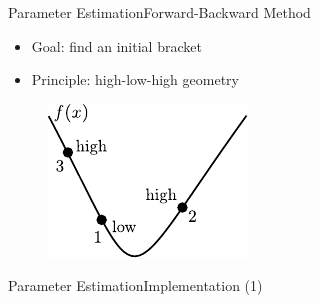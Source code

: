 \begin{frame}{Parameter Estimation}{Forward-Backward Method}
  \begin{itemize}
    \item Goal: find an initial bracket
    \item Principle: high-low-high geometry
  \end{itemize}
  \begin{figure}[H]
    \centering
    \includegraphics[scale=1.5]{Pictures/forward-backward.pdf}
  \end{figure}
\end{frame}


\begin{frame}{Parameter Estimation}{Implementation (1)}
\end{frame}

